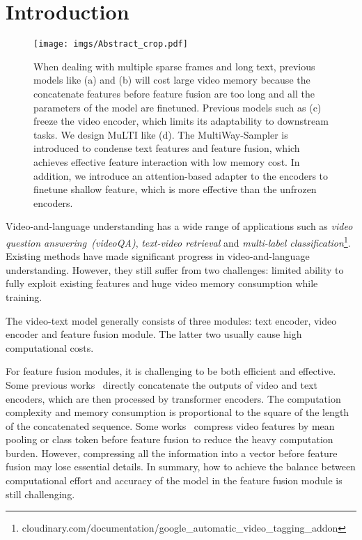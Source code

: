 \documentclass[10pt,twocolumn,letterpaper]{article}
\begin{document}
\section{Introduction}\label{sec:intro}
\vspace{-1ex}
\begin{figure*}
    \centering 
    \texttt{[image: imgs/Abstract\_crop.pdf]}
    \vspace{-1ex}
\caption{
        When dealing with multiple sparse frames and long text, previous models like (a) and (b) will cost large video memory because the concatenate features before feature fusion are too long and all the parameters of the model are finetuned. Previous models such as (c) freeze the video encoder, which limits its adaptability to downstream tasks. We design MuLTI like (d). The MultiWay-Sampler is introduced to condense text features and feature fusion, which achieves effective feature interaction with low memory cost. In addition, we introduce an attention-based adapter to the encoders to finetune shallow feature, which is more effective than the unfrozen encoders.
    }
    \label{fig:intro}
    \vspace{-3.5ex}
\end{figure*} 
Video-and-language understanding has a wide range of applications such as {\em video question answering~(videoQA)}, {\em text-video retrieval} and {\em multi-label classification}\footnote{cloudinary.com/documentation/google\_automatic\_video\_tagging\_addon}.
Existing methods have made significant progress in video-and-language understanding. However, they still suffer from two challenges: 
limited ability to fully exploit existing features and huge video memory consumption while training.

The video-text model generally consists of three modules: text encoder, video encoder and feature fusion module. The latter two usually cause high computational costs.

For feature fusion modules, it is challenging to be both efficient and effective. 
Some previous works~\cite{Fu2021VIOLETE, Huang2022CloverTA} directly concatenate the outputs of video and text encoders, which are then processed by transformer encoders. 
The computation complexity and memory consumption is proportional to the square of the length of the concatenated sequence. 
Some works~\cite{Lei2021Less,Li2021AlignAP,Yang2022ZeroShotVQ,Lei2021UnderstandingCV} compress video features by mean pooling or class token before feature fusion to reduce the heavy computation burden. 
However, compressing all the information into a vector before feature fusion may lose essential details.
In summary, how to achieve the balance between computational effort and accuracy of the model in the feature fusion module is still challenging.
\end{document}
